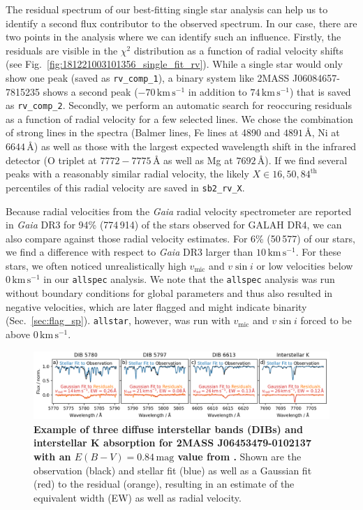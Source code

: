 \documentclass[
  journal=pasa,
  manuscript=research-paper, %
  year=2024,
  volume=37
]{cup-journal}
\newcommand{\vmic}{$v_\mathrm{mic}$\xspace}
\newcommand{\vsini}{$v \sin i$\xspace}
\newcommand{\Gaia}{\textit{Gaia}\xspace}
\begin{document}
The residual spectrum of our best-fitting single star analysis can help us to identify a second flux contributor to the observed spectrum. In our case, there are two points in the analysis where we can identify such an influence. Firstly, the residuals are visible in the $\chi^2$ distribution as a function of radial velocity shifts (see Fig.~\ref{fig:181221003101356_single_fit_rv}). While a single star would only show one peak (saved as \texttt{rv\_comp\_1}), a binary system like 2MASS J06084657-7815235 shows a second peak ($-70\,\mathrm{km\,s^{-1}}$ in addition to $74\,\mathrm{km\,s^{-1}}$) that is saved as \texttt{rv\_comp\_2}. Secondly, we perform an automatic search for reoccuring residuals as a function of radial velocity for a few selected lines. We chose the combination of strong lines in the spectra (Balmer lines, Fe lines at 4890 and $4891\,\text{\AA}$, Ni at $6644\,\text{\AA}$) as well as those with the largest expected wavelength shift in the infrared detector (O triplet at $7772-7775\,\text{\AA}$ as well as Mg at $7692\,\text{\AA}$). If we find several peaks with a reasonably similar radial velocity, the likely $X \in {16,50,84}^\text{th}$ percentiles of this radial velocity are saved in \texttt{sb2\_rv\_X}.

Because radial velocities from the \Gaia radial velocity spectrometer \citep{Katz2023} are reported in \Gaia DR3 for 94\% (774\,914) of the stars observed for GALAH DR4, we can also compare against those radial velocity estimates. For 6\% (50\,577) of our stars, we find a difference with respect to \Gaia DR3 larger than $10\,\mathrm{km\,s^{-1}}$. For these stars, we often noticed unrealistically high  \vmic and \vsini or low velocities below $0\,\mathrm{km\,s^{-1}}$ in our \texttt{allspec} analysis. We note that the \texttt{allspec} analysis was run without boundary conditions for global parameters and thus also resulted in negative velocities, which are later flagged and might indicate binarity (Sec.~\ref{sec:flag_sp}). \texttt{allstar}, however, was run with \vmic and \vsini forced to be above $0\,\mathrm{km\,s^{-1}}$.

\begin{figure}[ht]
 \centering
 \includegraphics[width=\textwidth]{figures/example_dibs_06453479-0102137.png}
 \caption{\textbf{Example of three diffuse interstellar bands (DIBs) and interstellar K absorption for 2MASS J06453479-0102137 with an $E(B-V) = 0.84\,\mathrm{mag}$ value from \citet{Schlegel1998}.} Shown are the observation (black) and stellar fit (blue) as well as a Gaussian fit (red) to the residual (orange), resulting in an estimate of the equivalent width (EW) as well as radial velocity.} %
 \label{fig:example_dibs_06453479-0102137}
\end{figure}
\end{document}
